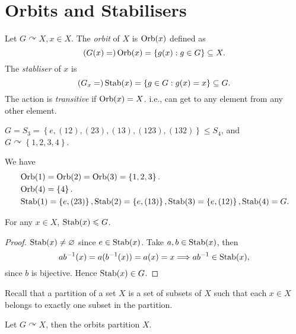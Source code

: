 \documentclass[10pt]{article}
\def\le{\leqslant}
\begin{document}
        \section{Orbits and Stabilisers}
        \begin{definition}
            Let $ G \curvearrowright X, x\in X $. The \textit{orbit} of $X$ is $ \operatorname{Orb}(x) $ defined as 
            \[
                (G(x)=)\operatorname{Orb}(x)=\left\{ g(x):g\in G\right\} \subseteq X
            .\]
            The \textit{stabliser} of $x$ is 
            \[
                (G_x=)\operatorname{Stab}(x)=\left\{ g\in G: g(x)=x\right\} \subseteq G
            .\]
            The action is \textit{transitive} if $ \operatorname{Orb}(x)=X $. i.e., can get to any element from any other element.
        \end{definition}
        \begin{example}
            $ G=S_3=\left\{ e,(12),(23),(13),(123),(132)\right\}\le S_4 $, and $ G \curvearrowright \left\{ 1,2,3,4\right\} $.

            We have
            \[
                \begin{aligned}
                    &\operatorname{Orb}(1)=\operatorname{Orb}(2)=\operatorname{Orb}(3)=\left\{ 1,2,3\right\}.\\
                    &\operatorname{Orb}(4)=\left\{ 4\right\}.\\
                    &\operatorname{Stab}(1)=\left\{ e,(23)\right\},
                    \operatorname{Stab}(2)=\left\{ e,(13)\right\},
                    \operatorname{Stab}(3)=\left\{ e,(12)\right\},
                    \operatorname{Stab}(4)=G.
                \end{aligned}
            \]
        \end{example}
        \begin{lemma}\label{lma:5.9}
            For any $ x\in X $, $ \stab(x) \le G$. 
        \end{lemma}
        \begin{proof}
            $ \operatorname{Stab}(x)\neq \varnothing $ since $ e\in \operatorname{Stab}(x) $. Take $ a,b\in \operatorname{Stab}(x) $, then 
            \[
                ab^{-1}(x)=a(b^{-1}(x))=a(x)=x \Longrightarrow ab^{-1}\in \operatorname{Stab}(x)
            ,\]
            since $b$ is bijective. Hence $ \operatorname{Stab}(x)\in G $.
        \end{proof}
        Recall that a partition of a set $X$ is a set of subsets of $X$ such that each $x\in X$ belongs to exactly one subset in the partition.
        \begin{lemma}\label{lma:5.10}
            Let $ G \curvearrowright X $, then the orbits partition $X$.
        \end{lemma}
\end{document}

